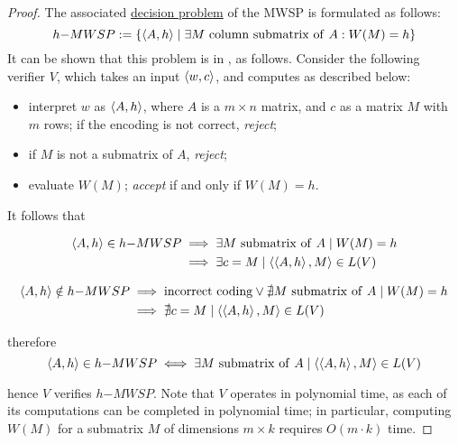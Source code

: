 \begin{proof}
    The associated \href{https://en.wikipedia.org/wiki/Decision_problem}{decision problem} of the MWSP is formulated as follows: $$h\mathrm{-}MWSP := \{\left\langle A,h\right\rangle \mid \exists M \mathrm{\ column \ submatrix \ of \ } A : W(M) = h\}$$ It can be shown that this problem is in \NPclass, as follows. Consider the following verifier $V$, which takes an input $\left\langle w, c\right\rangle$, and computes as described below:

    \begin{itemize}
        \item interpret $w$ as $\left\langle A, h\right\rangle$, where $A$ is a $m \times n$ matrix, and $c$ as a matrix $M$ with $m$ rows; if the encoding is not correct, \textit{reject};
        \item if $M$ is not a submatrix of $A$, \textit{reject};
        \item evaluate $W(M)$; \textit{accept} if and only if $W(M)=h$.
    \end{itemize}

    It follows that

    \begin{equation*}
        \begin{split}
            \left\langle A, h\right\rangle \in h\mathrm{-}MWSP & \implies \exists M \mathrm{\ submatrix \ of \ } A \mid W(M) = h \\
            & \implies \exists c = M \mid \left\langle\left\langle A, h\right\rangle, M\right\rangle \in L(V)
        \end{split}
    \end{equation*}

    \begin{equation*}
        \begin{split}
            \left\langle A, h\right\rangle \notin h\mathrm{-}MWSP & \implies \mathrm{incorrect \ coding} \lor \nexists M \mathrm{\ submatrix \ of \ } A \mid W(M) = h \\
            & \implies \nexists c = M \mid \left\langle\left\langle A, h\right\rangle, M\right\rangle \in L(V)
        \end{split}
    \end{equation*}

    therefore $$\left\langle A, h\right\rangle \in h\mathrm{-}MWSP \iff \exists M \mathrm{\ submatrix \ of \ } A \mid \left\langle\left\langle A, h\right\rangle, M\right\rangle \in L(V)$$

    hence $V$ verifies $h\mathrm{-}MWSP$. Note that $V$ operates in polynomial time, as each of its computations can be completed in polynomial time; in particular, computing $W(M)$ for a submatrix $M$ of dimensions $m \times k$ requires $O(m \cdot k)$ time.


\end{proof}
